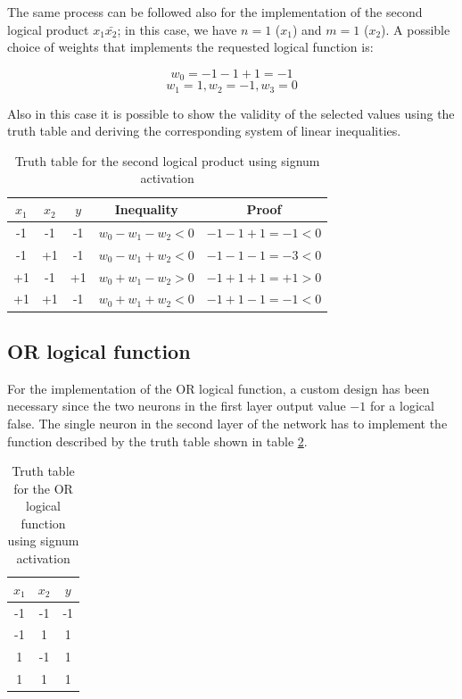 \documentclass[letterpaper,headings=standardclasses]{scrartcl}
\begin{document}
The same process can be followed also for the implementation of the second logical product $ x_1 \bar{x_2} $; in this case, we have $ n = 1 $ ($x_1$) and $ m = 1 $ ($x_2$). A possible choice of weights that implements the requested logical function is:

$$ w_0 = -1 -1 + 1 = -1 $$
$$ w_1 = 1, w_2 = -1, w_3 = 0 $$

Also in this case it is possible to show the validity of the selected values using the truth table and deriving the corresponding system of linear inequalities.

\begin{table}[h]
\centering
\begin{tabular}{|c|c|c|c|c|}
\hline
$x_1$ & $x_2$ & $y$ & Inequality & Proof \\ \hline
-1    & -1    & -1  & $w_0-w_1-w_2<0$ & $-1-1+1=-1<0$ \\ \hline
-1    & +1    & -1  & $w_0-w_1+w_2<0$ & $-1-1-1=-3<0$ \\ \hline
+1    & -1    & +1  & $w_0+w_1-w_2>0$ & $-1+1+1=+1>0$ \\ \hline
+1    & +1    & -1  & $w_0+w_1+w_2<0$ & $-1+1-1=-1<0$ \\ \hline
\end{tabular}
\caption{Truth table for the second logical product using signum activation}
\label{truth_prod2}
\end{table}

\subsection{OR logical function}

For the implementation of the OR logical function, a custom design has been necessary since the two neurons in the first layer output value $-1$ for a logical false. The single neuron in the second layer of the network has to implement the function described by the truth table shown in table \ref{truth_or}.

\begin{table}[h]
\centering
\begin{tabular}{|c|c|c|}
\hline
$x_1$ & $x_2$ & $y$ \\ \hline
-1    & -1    & -1  \\ \hline
-1    & 1     & 1   \\ \hline
1     & -1    & 1   \\ \hline
1     & 1     & 1   \\ \hline
\end{tabular}
\caption{Truth table for the OR logical function using signum activation}
\label{truth_or}
\end{table}
\end{document}
